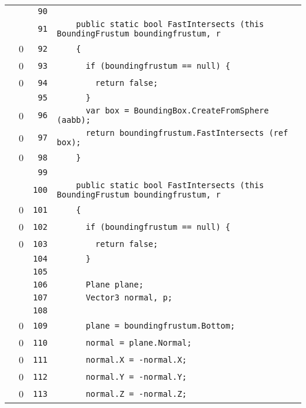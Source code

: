 \documentclass[a4paper,10pt]{article}
\begin{document}
\begin{longtable}[l]{lrrl}
\cellcolor{gray} &  & \verb~90~ & \verb~~\\
\cellcolor{gray} &  & \verb~91~ & \verb~    public static bool FastIntersects (this BoundingFrustum boundingfrustum, r~\\
\cellcolor{red} & 0 & \verb~92~ & \verb~    {~\\
\cellcolor{red} & 0 & \verb~93~ & \verb~      if (boundingfrustum == null) {~\\
\cellcolor{red} & 0 & \verb~94~ & \verb~        return false;~\\
\cellcolor{gray} &  & \verb~95~ & \verb~      }~\\
\cellcolor{red} & 0 & \verb~96~ & \verb~      var box = BoundingBox.CreateFromSphere (aabb);~\\
\cellcolor{red} & 0 & \verb~97~ & \verb~      return boundingfrustum.FastIntersects (ref box);~\\
\cellcolor{red} & 0 & \verb~98~ & \verb~    }~\\
\cellcolor{gray} &  & \verb~99~ & \verb~~\\
\cellcolor{gray} &  & \verb~100~ & \verb~    public static bool FastIntersects (this BoundingFrustum boundingfrustum, r~\\
\cellcolor{red} & 0 & \verb~101~ & \verb~    {~\\
\cellcolor{red} & 0 & \verb~102~ & \verb~      if (boundingfrustum == null) {~\\
\cellcolor{red} & 0 & \verb~103~ & \verb~        return false;~\\
\cellcolor{gray} &  & \verb~104~ & \verb~      }~\\
\cellcolor{gray} &  & \verb~105~ & \verb~~\\
\cellcolor{gray} &  & \verb~106~ & \verb~      Plane plane;~\\
\cellcolor{gray} &  & \verb~107~ & \verb~      Vector3 normal, p;~\\
\cellcolor{gray} &  & \verb~108~ & \verb~~\\
\cellcolor{red} & 0 & \verb~109~ & \verb~      plane = boundingfrustum.Bottom;~\\
\cellcolor{red} & 0 & \verb~110~ & \verb~      normal = plane.Normal;~\\
\cellcolor{red} & 0 & \verb~111~ & \verb~      normal.X = -normal.X;~\\
\cellcolor{red} & 0 & \verb~112~ & \verb~      normal.Y = -normal.Y;~\\
\cellcolor{red} & 0 & \verb~113~ & \verb~      normal.Z = -normal.Z;~\\

\end{longtable}
\end{document}
